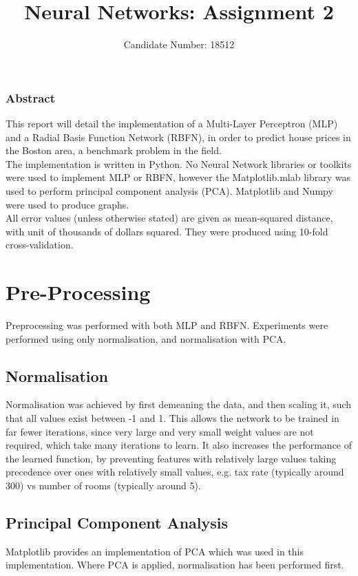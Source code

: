 \documentclass{article}
\title{Neural Networks: Assignment 2}
\author{Candidate Number: 18512}
\begin{document}
\maketitle

\begin{centering}
\subsubsection*{Abstract}
\end{centering}
\noindent This report will detail the implementation of a Multi-Layer Perceptron (MLP) and a Radial Basis Function Network (RBFN), in order to predict house prices in the Boston area, a benchmark problem in the field. \\
\indent The implementation is written in Python. No Neural Network libraries or toolkits were used to implement MLP or RBFN, however the Matplotlib.mlab library was used to perform principal component analysis (PCA). Matplotlib and Numpy were used to produce graphs. \\
\indent All error values (unless otherwise stated) are given as mean-squared distance, with unit of thousands of dollars squared. They were produced using 10-fold cross-validation.
\vspace{4mm}

\section*{Pre-Processing}
\noindent Preprocessing was performed with both MLP and RBFN. Experiments were performed using only normalisation, and normalisation with PCA.
\subsection*{Normalisation}
\noindent Normalisation was achieved by first demeaning the data, and then scaling it, such that all values exist between -1 and 1. This allows the network to be trained in far fewer iterations, since very large and very small weight values are not required, which take many iterations to learn. It also increases the performance of the learned function, by preventing features with relatively large values taking precedence over ones with relatively small values, e.g. tax rate (typically around 300) vs number of rooms (typically around 5).
\subsection*{Principal Component Analysis}
\noindent Matplotlib provides an implementation of PCA which was used in this implementation. Where PCA is applied, normalisation has been performed first.
\end{document}
